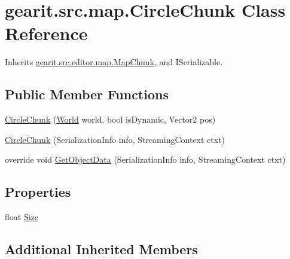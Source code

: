 \hypertarget{classgearit_1_1src_1_1map_1_1_circle_chunk}{\section{gearit.\+src.\+map.\+Circle\+Chunk Class Reference}
\label{classgearit_1_1src_1_1map_1_1_circle_chunk}
}


Inherits \hyperlink{classgearit_1_1src_1_1editor_1_1map_1_1_map_chunk}{gearit.\+src.\+editor.\+map.\+Map\+Chunk}, and I\+Serializable.

\subsection*{Public Member Functions}
\begin{DoxyCompactItemize}
\item 
\hyperlink{classgearit_1_1src_1_1map_1_1_circle_chunk_a1c5014d0b7827443bed70324356ae77d}{Circle\+Chunk} (\hyperlink{class_farseer_physics_1_1_dynamics_1_1_world}{World} world, bool is\+Dynamic, Vector2 pos)
\item 
\hyperlink{classgearit_1_1src_1_1map_1_1_circle_chunk_a051d4270e58e19bb67a3f1f1ae352b72}{Circle\+Chunk} (Serialization\+Info info, Streaming\+Context ctxt)
\item 
override void \hyperlink{classgearit_1_1src_1_1map_1_1_circle_chunk_ae7728381e71bffb1bd2c42f8f08325bd}{Get\+Object\+Data} (Serialization\+Info info, Streaming\+Context ctxt)
\end{DoxyCompactItemize}
\subsection*{Properties}
\begin{DoxyCompactItemize}
\item 
float \hyperlink{classgearit_1_1src_1_1map_1_1_circle_chunk_af2003c144d2c3e2d94650c696d392ac3}{Size}
\end{DoxyCompactItemize}
\subsection*{Additional Inherited Members}


